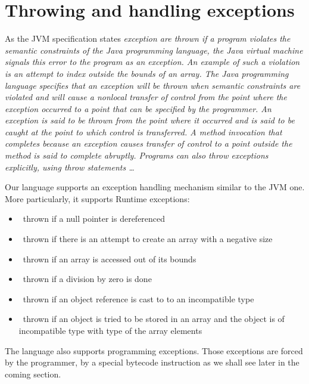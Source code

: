 
\section{Throwing and handling exceptions}\label{opSem:exc}

As the JVM specification states \textit{exception are thrown if a program violates the semantic constraints of the Java programming language,
 the Java virtual machine signals this error to the program as an exception. An example of such a violation is an 
attempt to index outside the bounds of an array. The Java programming language specifies that an exception will be thrown when
 semantic constraints are violated and will cause a nonlocal transfer of control from the point where the exception occurred to
 a point that can be specified by the programmer. An exception is said to be thrown from the point where it occurred and is said to be
 caught at the point to which control is transferred. A method invocation that completes because an exception causes transfer of
 control to a point outside the method is said to complete abruptly. Programs can also throw exceptions explicitly, using throw statements \ldots }

Our language supports an exception handling mechanism similar to the JVM one.
 More particularly, it supports  Runtime exceptions: 
 \begin{itemize}
   \item \NullPointerExc \ thrown if a null pointer is dereferenced
   \item \NegativeArraySizeExc \ thrown if there is an attempt to create  an array with a negative size 
   \item \ArrIndexOutOfBoundExc \ thrown if an array is accessed out of its bounds
   \item \ArithExc \ thrown if a division by zero is done
   \item \ClassCastExc \ thrown if an object reference is cast to to an incompatible type
   \item \ArrStoreExc \ thrown if an object is tried to be stored in an array and the object is of incompatible type with type of the  array elements
\end{itemize}

The language also supports programming exceptions. Those exceptions are forced by the programmer, by a special bytecode 
instruction as we shall see later in the coming section. 

